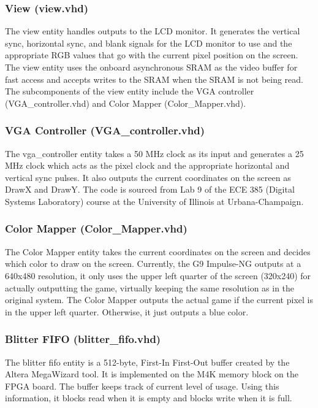 \documentclass{report}
\begin{document}
\subsubsection{View (view.vhd)}
The view entity handles outputs to the LCD monitor. It generates the 
vertical sync, horizontal sync, and blank signals for the LCD monitor to 
use and the appropriate RGB values that go with the current pixel 
position on the screen. The view entity uses the onboard asynchronous 
SRAM as the video buffer for fast access and accepts writes to the SRAM 
when the SRAM is not being read. The subcomponents of the view entity 
include the VGA controller (VGA\_controller.vhd) and Color Mapper 
(Color\_Mapper.vhd).

\subsubsection{VGA Controller (VGA\_controller.vhd)}
The vga\_controller entity takes a 50 MHz clock as its input and 
generates a 25 MHz clock which acts as the pixel clock and the 
appropriate horizontal and vertical sync pulses. It also outputs the 
current coordinates on the screen as DrawX and DrawY. The code is 
sourced from Lab 9 of the ECE 385 (Digital Systems Laboratory) course at 
the University of Illinois at Urbana-Champaign.

\subsubsection{Color Mapper (Color\_Mapper.vhd)}
The Color Mapper entity takes the current coordinates on the screen and 
decides which color to draw on the screen. Currently, the G9 Impulse-NG 
outputs at a 640x480 resolution, it only uses the upper left quarter of 
the screen (320x240) for actually outputting the game, virtually keeping 
the same resolution as in the original system. The Color Mapper outputs 
the actual game if the current pixel is in the upper left quarter. 
Otherwise, it just outputs a blue color.

\subsubsection{Blitter FIFO (blitter\_fifo.vhd)}
The blitter fifo entity is a 512-byte, First-In First-Out buffer created 
by the Altera MegaWizard tool. It is implemented on the M4K memory block 
on the FPGA board. The buffer keeps track of current level of usage. 
Using this information, it blocks read when it is empty and blocks write 
when it is full.
\end{document}
